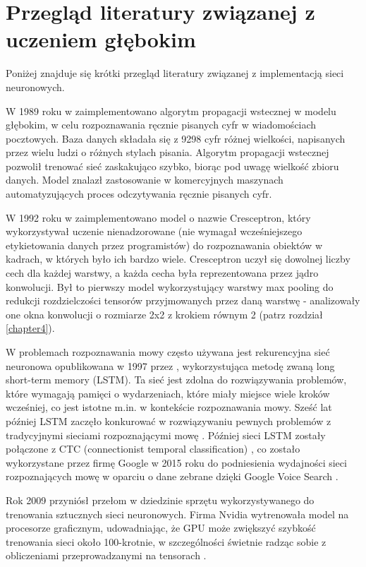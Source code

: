 \section{Przegląd literatury związanej z uczeniem głębokim}

Poniżej znajduje się krótki przegląd literatury związanej z implementacją sieci neuronowych.

W 1989 roku w \cite{BackpropagationLeCun} zaimplementowano algorytm propagacji wstecznej w modelu głębokim, w celu rozpoznawania ręcznie pisanych cyfr w wiadomościach pocztowych. Baza danych składała się z 9298 cyfr różnej wielkości, napisanych przez wielu ludzi o różnych stylach pisania. Algorytm propagacji wstecznej pozwolił trenować sieć zaskakująco szybko, biorąc pod uwagę wielkość zbioru danych. Model znalazł zastosowanie w komercyjnych maszynach automatyzujących proces odczytywania ręcznie pisanych cyfr.

W 1992 roku w \cite{Cresceptron} zaimplementowano model o nazwie Cresceptron, który wykorzystywał uczenie nienadzorowane (nie wymagał wcześniejszego etykietowania danych przez programistów) do rozpoznawania obiektów w kadrach, w których było ich bardzo wiele. Cresceptron uczył się dowolnej liczby cech dla każdej warstwy, a każda cecha była reprezentowana przez jądro konwolucji. Był to pierwszy model wykorzystujący warstwy max pooling do redukcji rozdzielczości tensorów przyjmowanych przez daną warstwę - analizowały one okna konwolucji o rozmiarze 2x2 z krokiem równym 2 (patrz rozdział \ref{chapter4}). 

W problemach rozpoznawania mowy często używana jest rekurencyjna sieć neuronowa opublikowana w 1997 przez \cite{LSTMSchmidhuber}, wykorzystująca metodę zwaną long short-term memory (LSTM). Ta sieć jest zdolna do rozwiązywania problemów, które wymagają pamięci o wydarzeniach, które miały miejsce 
wiele kroków wcześniej, co jest istotne m.in. w kontekście rozpoznawania mowy. Sześć lat później LSTM zaczęło konkurować w rozwiązywaniu pewnych problemów z tradycyjnymi sieciami rozpoznającymi mowę \cite{LSTMGraves}. Później sieci LSTM zostały połączone z CTC (connectionist temporal classification) \cite{CTC}, co zostało wykorzystane przez firmę Google w 2015 roku do podniesienia wydajności sieci rozpoznających mowę w oparciu o dane zebrane dzięki Google Voice Search \cite{GVS}.

Rok 2009 przyniósł przełom w dziedzinie sprzętu wykorzystywanego do trenowania sztucznych sieci neuronowych. Firma Nvidia wytrenowała model na procesorze graficznym, udowadniając, że GPU może zwiększyć szybkość trenowania sieci około 100-krotnie, w szczególności świetnie radząc sobie z obliczeniami przeprowadzanymi na tensorach \cite{GPUOh}. 

